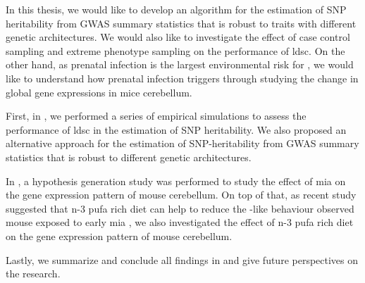 	In this thesis, we would like to develop an algorithm for the estimation of \gls{SNP} heritability from \gls{GWAS} summary statistics that is robust to traits with different genetic architectures. 
	We would also like to investigate the effect of case control sampling and extreme phenotype sampling on the performance of \gls{ldsc}.
	On the other hand, as prenatal infection is the largest environmental risk for , we would like to understand how prenatal infection triggers  through studying the change in global gene expressions in mice cerebellum.
	
	First, in , we performed a series of empirical simulations to assess the performance of \gls{ldsc} in the estimation of \gls{SNP} heritability. 
	We also proposed an alternative approach for the estimation of \gls{SNP}-heritability from \gls{GWAS} summary statistics that is robust to different genetic architectures.
	
	In , a hypothesis generation study was performed to study the effect of \gls{mia} on the gene expression pattern of mouse cerebellum. 
	On top of that, as recent study suggested that n-3 \gls{pufa} rich diet can help to reduce the -like behaviour observed mouse exposed to early \gls{mia} \citep{Li2015}, we also investigated the effect of n-3 \gls{pufa} rich diet on the gene expression pattern of mouse cerebellum.
	
	Lastly, we summarize and conclude all findings in  and give future perspectives on the  research.
	